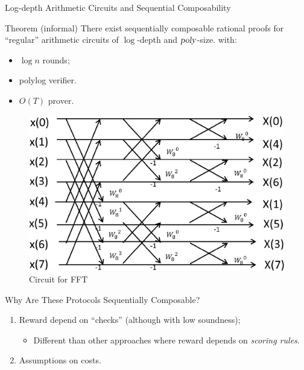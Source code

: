 \begin{frame}[t]{Log-depth Arithmetic Circuits and Sequential Composability}
\begin{block}{Theorem (informal)}
There exist sequentially composable rational proofs for ``regular'' arithmetic circuits of $\log$-depth and ${\textsl{poly}}$-size. with:
		\begin{itemize}
			\item $\log n$ rounds;
			\item polylog verifier.
			\item $O(T)$ prover.
		\end{itemize}
\end{block}

\begin{figure}
	\includegraphics[scale=0.36]{pics/fft.jpg}
	\caption{Circuit for FFT}
\end{figure}
\end{frame}

\begin{frame}{Why Are These Protocols Sequentially Composable?}
	\begin{enumerate}
		\item Reward depend on ``checks'' (although with low soundness);\pause
		\begin{itemize}
			\item Different than other approaches where reward depends on \textit{scoring rules}.
		\end{itemize}\pause
		\item Assumptions on costs.
	\end{enumerate}
\end{frame}

